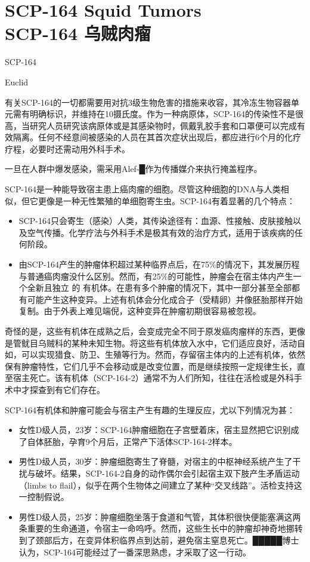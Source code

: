 \chapter[SCP-164 乌贼肉瘤]{
    SCP-164 Squid Tumors\\
    SCP-164 乌贼肉瘤
}

\label{chap:SCP-164}

SCP-164

Euclid

有关SCP-164的一切都需要用对抗3级生物危害的措施来收容，其冷冻生物容器单元需有明确标识，并维持在10摄氏度。作为一种病原体，SCP-164的传染性不是很高，当研究人员研究该病原体或是其感染物时，佩戴乳胶手套和口罩便可以完成有效隔离。任何不经意间被感染的人员在其首次症状出现后，都应进行6个月的化疗疗程，必要时还需动用外科手术。

一旦在人群中爆发感染，需采用Alef-█作为传播媒介来执行掩盖程序。

SCP-164是一种能导致宿主患上癌肉瘤的细胞。尽管这种细胞的DNA与人类相似，但它更像是一种无性繁殖的单细胞寄生虫。SCP-164有着显著的几个特点：

\begin{itemize}
\item SCP-164只会寄生（感染）人类，其传染途径有：血源、性接触、皮肤接触以及空气传播。化学疗法与外科手术是极其有效的治疗方式，适用于该疾病的任何阶段。
\item 由SCP-164产生的肿瘤体积超过某种临界点后，在75\%的情况下，其发展历程与普通癌肉瘤没什么区别。然而，有25\%的可能性，肿瘤会在宿主体内产生一个全新且独立 的 有机体。在患有多个肿瘤的情况下，其中一部分甚至全部都有可能产生这种变异。上述有机体会分化成合子（受精卵）并像胚胎那样开始复制。由于外表上难见端倪，这种变异在肿瘤初期很容易被忽视。
\end{itemize}

奇怪的是，这些有机体在成熟之后，会变成完全不同于原发癌肉瘤样的东西，更像是管鱿目乌贼科的某种未知生物。将这些有机体放入水中，它们适应良好，活动自如，可以实现猎食、防卫、生殖等行为。然而，存留宿主体内的上述有机体，依然保有肿瘤特性，它们几乎不会移动或是改变位置，而是继续按照一定规律生长，直至宿主死亡。该有机体（SCP-164-2）通常不为人们所知，往往在活检或是外科手术中才探查到有它们存在。

SCP-164有机体和肿瘤可能会与宿主产生有趣的生理反应，尤以下列情况为甚：

\begin{itemize}
\item 女性D级人员，23岁：SCP-164肿瘤细胞在子宫壁着床，宿主显然把它识别成了自体胚胎，孕育9个月后，正常产下活体SCP-164-2样本。
\item 男性D级人员，30岁：肿瘤细胞寄生了脊髓，对宿主的中枢神经系统产生了干扰与破坏。结果，SCP-164-2自身的动作偶尔会引起宿主双下肢产生矛盾运动（limbs to flail），似乎在两个生物体之间建立了某种“交叉线路”。活检支持这一控制假说。
\item 男性D级人员，25岁：肿瘤细胞坐落于食道和气管，其体积很快便能塞满这两条重要的生命通道，令宿主一命呜呼。然而，这些生长中的肿瘤却神奇地挪转到了颈部后方，在变异体积临界点到达前，避免宿主窒息死亡。█████博士认为，SCP-164可能经过了一番深思熟虑，才采取了这一行动。
\end{itemize}

